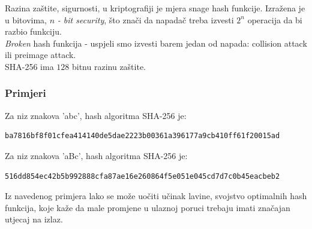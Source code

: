 \documentclass[12pt]{article}
\begin{document}
Razina zaštite, sigurnosti, u kriptografiji je mjera snage hash funkcije. Izražena je u bitovima, $n$ \textit{- bit security}, što znači da napadač treba izvesti $2^n$ operacija da bi razbio funkciju.\\ \textit{Broken} hash funkcija - uspjeli smo izvesti barem jedan od napada: collision attack ili preimage attack. \\ 
SHA-256 ima $128$ bitnu razinu zaštite.

\pagebreak

\subsubsection{Primjeri}
Za niz znakova 'abc', hash algoritma SHA-256 je:
\begin{verbatim}
ba7816bf8f01cfea414140de5dae2223b00361a396177a9cb410ff61f20015ad
\end{verbatim}
%
Za niz znakova 'aBc', hash algoritma SHA-256 je:
\begin{verbatim}
516dd854ec42b5b992888cfa87ae16e260864f5e051e045cd7d7c0b45eacbeb2
\end{verbatim}
%
Iz navedenog primjera lako se može uočiti učinak lavine, svojstvo optimalnih hash funkcija, koje kaže da male promjene u ulaznoj poruci trebaju imati značajan utjecaj na izlaz.
\end{document}
